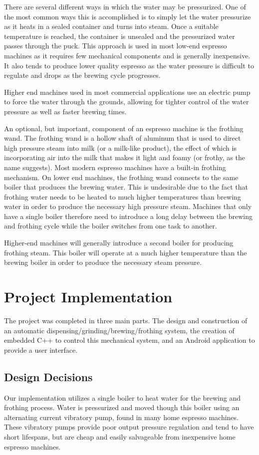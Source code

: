 \documentclass[conference]{IEEEtran}
\begin{document}
There are several different ways in which the water may be pressurized. One of
the most common ways this is accomplished is to simply let the water pressurize
as it heats in a sealed container and turns into steam. Once a suitable
temperature is reached, the container is unsealed and the pressurized water
passes through the puck. This approach is used in most low-end espresso machines
as it requires few mechanical components and is generally inexpensive. It also
tends to produce lower quality espresso as the water pressure is difficult to
regulate and drops as the brewing cycle progresses.

Higher end machines used in most commercial applications use an electric pump to
force the water through the grounds, allowing for tighter control of the
water pressure as well as faster brewing times.

An optional, but important, component of an espresso machine is the frothing
wand. The frothing wand is a hollow shaft of aluminum that is used to direct
high pressure steam into milk (or a milk-like product), the effect of which is
incorporating air into the milk that makes it light and foamy (or frothy, as
the name suggests). Most modern espresso machines have a built-in frothing
mechanism. On lower end machines, the frothing wand connects to the same boiler
that produces the brewing water. This is undesirable due to the fact that
frothing water needs to be heated to much higher temperatures than brewing water
in order to produce the necessary high pressure steam. Machines that only have a
single boiler therefore need to introduce a long delay between the brewing and
frothing cycle while the boiler switches from one task to another.

Higher-end machines will generally introduce a second boiler for producing
frothing steam. This boiler will operate at a much higher temperature than the
brewing boiler in order to produce the necessary steam pressure.


\section{Project Implementation}
The project was completed in three main parts. The design and construction of an
automatic dispensing/grinding/brewing/frothing system, the creation of embedded
C++ to control this mechanical system, and an Android application to provide a user
interface.

\subsection{Design Decisions}
Our implementation utilizes a single boiler to heat water for the brewing and frothing process. Water is
pressurized and moved though this boiler using an alternating current vibratory
pump, found in many home espresso machines. These vibratory pumps provide poor output pressure
regulation and tend to have short lifespans, but are cheap and easily salvageable from inexpensive
home espresso machines.
\end{document}
